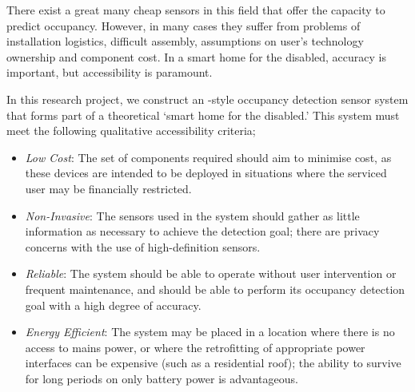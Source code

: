 \documentclass[../thesis/thesis.tex]{subfiles}
\begin{document}
There exist a great many cheap sensors in this field that offer the capacity to predict occupancy. However, in many cases they suffer from problems of installation logistics, difficult assembly, assumptions on user's technology ownership and component cost. In a smart home for the disabled, accuracy is important, but accessibility is paramount.

In this research project, we construct an \iot-style occupancy detection sensor system that forms part of a theoretical `smart home for the disabled.' This system must meet the following qualitative accessibility criteria;

\begin{itemize}
 \item \emph{Low Cost}: The set of components required should aim to minimise cost, as these devices are intended to be deployed in situations where the serviced user may be financially restricted.
 
 \item \emph{Non-Invasive}: The sensors used in the system should gather as little information as necessary to achieve the detection goal; there are privacy concerns with the use of high-definition sensors.
 
 \item \emph{Reliable}: The system should be able to operate without user intervention or frequent maintenance, and should be able to perform its occupancy detection goal with a high degree of accuracy.
 
 \item \emph{Energy Efficient}: The system may be placed in a location where there is no access to mains power, or where the retrofitting of appropriate power interfaces can be expensive (such as a residential roof); the ability to survive for long periods on only battery power is advantageous.
\end{itemize}
\end{document}
